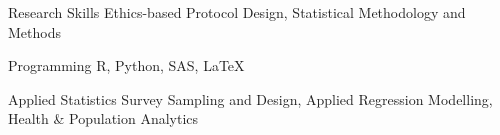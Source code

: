 

\begin{cvskills}





 
  \cvskill
    {Research Skills} %
    {Ethics-based Protocol Design, Statistical Methodology and Methods} %


    
  \cvskill
    {Programming} %
    {R, Python, SAS, LaTeX} %

  \cvskill
    {Applied Statistics} %
    {Survey Sampling and Design, Applied Regression Modelling, Health \& Population Analytics} %




\end{cvskills}
